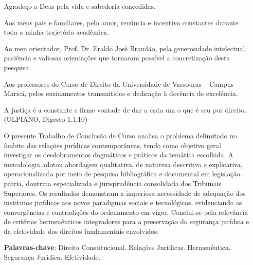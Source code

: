 \documentclass[
    12pt,               %
    openright,          %
    oneside,            %
    a4paper,            %
    english,            %
    brazil              %
]{abntex2}
\begin{document}
\begin{agradecimentos}
Agradeço a Deus pela vida e sabedoria concedidas.

Aos meus pais e familiares, pelo amor, renúncia e incentivo constantes durante toda a minha trajetória acadêmica.

Ao meu orientador, Prof. Dr. Eraldo José Brandão, pela generosidade intelectual, paciência e valiosas orientações que tornaram possível a concretização desta pesquisa.

Aos professores do Curso de Direito da Universidade de Vassouras -- Campus Maricá, pelos ensinamentos transmitidos e dedicação à docência de excelência.
\end{agradecimentos}

\begin{epigrafe}
    \vspace*{\fill}
    \begin{flushright}
        \begin{minipage}{0.5\textwidth}
            \SingleSpacing
            \noindent
            A justiça é a constante e firme vontade de dar a cada um o que é seu por direito.\\
            \vspace*{0.3cm}
            (ULPIANO, Digesto 1.1.10)
        \end{minipage}
    \end{flushright}
\end{epigrafe}

\setlength{\absparsep}{18pt}
\begin{resumo}
 \SingleSpacing
 O presente Trabalho de Conclusão de Curso analisa o problema delimitado no âmbito das relações jurídicas contemporâneas, tendo como objetivo geral investigar os desdobramentos dogmáticos e práticos da temática escolhida. A metodologia adotou abordagem qualitativa, de natureza descritiva e explicativa, operacionalizada por meio de pesquisa bibliográfica e documental em legislação pátria, doutrina especializada e jurisprudência consolidada dos Tribunais Superiores. Os resultados demonstram a imperiosa necessidade de adequação dos institutos jurídicos aos novos paradigmas sociais e tecnológicos, evidenciando as convergências e contradições do ordenamento em vigor. Conclui-se pela relevância de critérios hermenêuticos integradores para a preservação da segurança jurídica e da efetividade dos direitos fundamentais envolvidos.

 \textbf{Palavras-chave}: Direito Constitucional. Relações Jurídicas. Hermenêutica. Segurança Jurídica. Efetividade.
\end{resumo}
\end{document}
